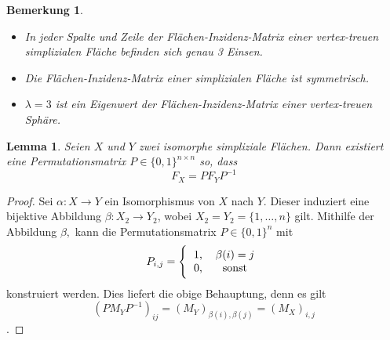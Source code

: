 \documentclass[12pt,titlepage,twoside,cleardoublepage]{article}
\theoremstyle{nummermitklammern}
\newtheorem{lemma}[temp]{Lemma}
\newtheorem{bemerkung}[temp]{Bemerkung}
\newtheorem{lemma}[zahl]{Lemma}
\newtheorem{bemerkung}[zahl]{Bemerkung}
\numberwithin{equation}{section}
\begin{document}
\begin{bemerkung}
\begin{itemize}
\item In jeder Spalte und Zeile der Flächen-Inzidenz-Matrix einer vertex-treuen simplizialen Fläche befinden sich genau 3 Einsen. 
\item Die Flächen-Inzidenz-Matrix einer simplizialen Fläche  ist symmetrisch.
\item $\lambda =3$ ist ein Eigenwert der Flächen-Inzidenz-Matrix einer vertex-treuen Sphäre. 
\end{itemize}
\end{bemerkung}
\begin{lemma}
Seien $X$ und $Y$ zwei isomorphe simpliziale Flächen. Dann existiert eine Permutationsmatrix $P\in \{0,1\}^{n \times n}$ so, dass 
\[
F_X=PF_YP^{-1}
\] 
\end{lemma}
\begin{proof}
Sei $\alpha:X \to Y $ ein Isomorphismus von $X$ nach $Y$. Dieser induziert eine bijektive Abbildung $\beta :X_2\to Y_2$, wobei $X_2=Y_2=\{1,\ldots,n\}$ gilt. Mithilfe der Abbildung $\beta,$ kann die Permutationsmatrix $P\in \{0,1\}^n$ mit
\[
P_{i,j}=
\Biggl\{
\begin{tabular}[l]{lcr}
1,&\textcolor{black}{$\beta(i)=j$} \\
0,& sonst\\
\end{tabular}
\]
konstruiert werden.
Dies liefert die obige Behauptung, denn es gilt
\[
(PM_YP^{-1})_{ij}=(M_Y)_{\beta(i),\beta(j)}=(M_X)_{i,j}
\] .
\end{proof}
\end{document}

